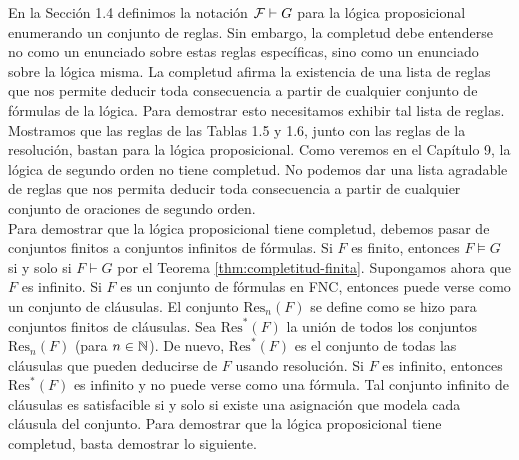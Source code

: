 \documentclass[12pt,a4paper]{book}
\begin{document}
    En la Sección 1.4 definimos la notación $\mathcal{F}\vdash G$ para la lógica proposicional enumerando un conjunto de reglas. Sin
    embargo, la completud debe entenderse no como un enunciado sobre estas reglas específicas, sino como un enunciado
    sobre la lógica misma. La completud afirma la existencia de una lista de reglas que nos permite deducir toda
    consecuencia a partir de cualquier conjunto de fórmulas de la lógica. Para demostrar esto necesitamos exhibir tal lista
    de reglas. Mostramos que las reglas de las Tablas 1.5 y 1.6, junto con las reglas de la resolución, bastan para la
    lógica proposicional. Como veremos en el Capítulo 9, la lógica de segundo orden no tiene completud. No podemos dar una
    lista agradable de reglas que nos permita deducir toda consecuencia a partir de cualquier conjunto de oraciones de
    segundo orden.\\
    Para demostrar que la lógica proposicional tiene completud, debemos pasar de conjuntos finitos a conjuntos infinitos
    de fórmulas. Si $F$ es finito, entonces $F\models G$ si y solo si $F\vdash G$ por el Teorema
    \ref{thm:completitud-finita}. Supongamos ahora que $F$ es infinito. Si $F$ es un conjunto de fórmulas en FNC, entonces
    puede verse como un conjunto de cláusulas. El conjunto $\mathrm{Res}_{n}(F)$ se define como se hizo para conjuntos
    finitos de cláusulas. Sea $\mathrm{Res}^{*}(F)$ la unión de todos los conjuntos $\mathrm{Res}_{n}(F)$ (para $n\in\mathbb{N}$). De
    nuevo, $\mathrm{Res}^{*}(F)$ es el conjunto de todas las cláusulas que pueden deducirse de $F$ usando resolución. Si $F$
    es infinito, entonces $\mathrm{Res}^{*}(F)$ es infinito y no puede verse como una fórmula. Tal conjunto infinito de
    cláusulas es satisfacible si y solo si existe una asignación que modela cada cláusula del conjunto. Para demostrar que
    la lógica proposicional tiene completud, basta demostrar lo siguiente.
\end{document}

